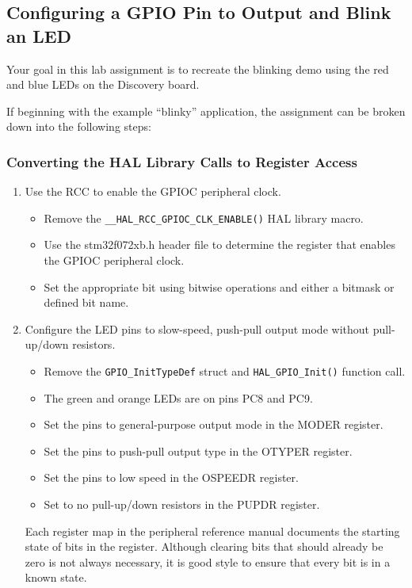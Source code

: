 \documentclass[11pt,fleqn]{book} %
\begin{document}
\subsection{Configuring a GPIO Pin to Output and Blink an LED}

Your goal in this lab assignment is to recreate the blinking demo using the red and blue LEDs on the Discovery board. 

If beginning with the example ``blinky'' application, the assignment can be broken down into the following steps:

\subsubsection{Converting the HAL Library Calls to Register Access}
\begin{enumerate}
    
    \item Use the RCC to enable the GPIOC peripheral clock.
    \begin{itemize}
        \item Remove the \texttt{\_\_HAL\_RCC\_GPIOC\_CLK\_ENABLE()} HAL library macro.
        \item Use the stm32f072xb.h header file to determine the register that enables the GPIOC peripheral clock.
        \item Set the appropriate bit using bitwise operations and either a bitmask or defined bit name. 
    \end{itemize}
    \item Configure the LED pins to slow-speed, push-pull output mode without pull-up/down resistors.
    \begin{itemize}
        \item Remove the \texttt{GPIO\_InitTypeDef} struct and \texttt{HAL\_GPIO\_Init()} function call.
        \item The green and orange LEDs are on pins PC8 and PC9.
        \item Set the pins to general-purpose output mode in the MODER register. 
        \item Set the pins to push-pull output type in the OTYPER register.
        \item Set the pins to low speed in the OSPEEDR register. 
        \item Set to no pull-up/down resistors in the PUPDR register. 
    \end{itemize}

    Each register map in the peripheral reference manual documents the starting state of bits in the register. Although clearing bits that should already be zero is not always necessary, it is good style to ensure that every bit is in a known state.  
    \medskip


\end{enumerate}
\end{document}
